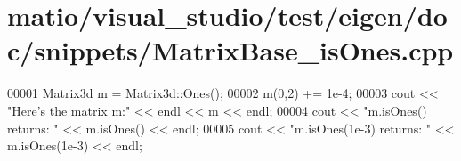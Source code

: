 \hypertarget{matio_2visual__studio_2test_2eigen_2doc_2snippets_2_matrix_base__is_ones_8cpp_source}{}\section{matio/visual\+\_\+studio/test/eigen/doc/snippets/\+Matrix\+Base\+\_\+is\+Ones.cpp}
\label{matio_2visual__studio_2test_2eigen_2doc_2snippets_2_matrix_base__is_ones_8cpp_source}

\begin{DoxyCode}
00001 Matrix3d m = Matrix3d::Ones();
00002 m(0,2) += 1e-4;
00003 cout << \textcolor{stringliteral}{"Here's the matrix m:"} << endl << m << endl;
00004 cout << \textcolor{stringliteral}{"m.isOnes() returns: "} << m.isOnes() << endl;
00005 cout << \textcolor{stringliteral}{"m.isOnes(1e-3) returns: "} << m.isOnes(1e-3) << endl;
\end{DoxyCode}
